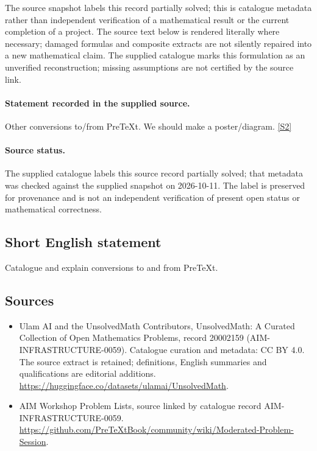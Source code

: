 \documentclass[11pt]{article}
\begin{document}
The source snapshot labels this record partially solved; this is catalogue metadata rather than independent verification of a mathematical result or the current completion of a project.
The source text below is rendered literally where necessary; damaged formulas and composite extracts are not silently repaired into a new mathematical claim.
The supplied catalogue marks this formulation as an unverified reconstruction; missing assumptions are not certified by the source link.
\paragraph{Statement recorded in the supplied source.}
Other conversions to/from PreTeXt. We should make a poster/diagram. \href{https://github.com/PreTeXtBook/community/wiki/Moderated-Problem-Session}{[S2]}
\paragraph{Source status.}
The supplied catalogue labels this source record partially solved; that metadata was checked against the supplied snapshot on 2026-10-11. The label is preserved for provenance and is not an independent verification of present open status or mathematical correctness.
\subsection{Short English statement}
Catalogue and explain conversions to and from PreTeXt.
\subsection{Sources}
\begin{itemize}
\item[S1] Ulam AI and the UnsolvedMath Contributors, UnsolvedMath: A Curated Collection of Open Mathematics Problems, record 20002159 (AIM-INFRASTRUCTURE-0059). Catalogue curation and metadata: CC BY 4.0. The source extract is retained; definitions, English summaries and qualifications are editorial additions.
\url{https://huggingface.co/datasets/ulamai/UnsolvedMath}.
\item[S2] AIM Workshop Problem Lists, source linked by catalogue record AIM-INFRASTRUCTURE-0059.
\url{https://github.com/PreTeXtBook/community/wiki/Moderated-Problem-Session}.
\end{itemize}
\end{document}
